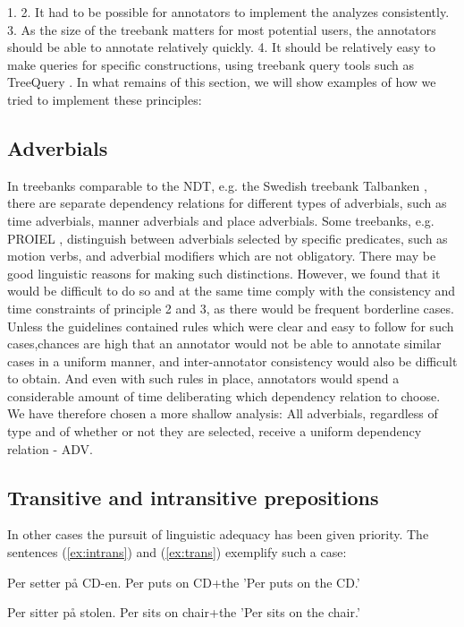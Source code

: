\documentclass[11pt,a4paper]{article}
\begin{document}
 1. 
2. It had to be possible for annotators to implement the analyzes consistently. 3. As the size of the treebank matters for most potential users, the annotators should be able to annotate relatively quickly.
4. It should be relatively easy to make queries for specific constructions, using treebank query tools such as TreeQuery \cite{Paj:Ste:09}. In what remains of this section, we will show examples of how we tried to implement these principles:

\subsection{Adverbials}
In treebanks comparable to the NDT, e.g. the Swedish treebank Talbanken \cite{Niv:Nil:Hal:2006}, there are separate dependency relations for different types of adverbials, such as time adverbials, manner adverbials and place adverbials. Some treebanks, e.g. PROIEL \cite{Hau:Joh:Eck:Wel:Her:Mut:2009}, distinguish between adverbials selected by specific predicates, such as motion verbs, and adverbial modifiers which are not obligatory. There may be good linguistic reasons for making such distinctions. However, we found that it would be difficult to do so and at the same time comply with the consistency and time constraints of principle 2 and 3, as there would be frequent borderline cases. Unless the guidelines contained rules which were clear and easy to follow for such cases,chances are high that an annotator would not be able to annotate similar cases in a uniform manner, and inter-annotator consistency would also be difficult to obtain. And even with such rules in place, annotators would spend a considerable amount of time deliberating which dependency relation to choose. We have therefore chosen a more shallow analysis: All adverbials, regardless of type and of whether or not they are selected, receive a uniform dependency relation - ADV.

\subsection{Transitive and intransitive prepositions}
In other cases the pursuit of linguistic adequacy has been given priority. The sentences (\ref{ex:intrans}) and (\ref{ex:trans}) exemplify such a case:

\begin{examples}
\item\label{ex:intrans}
\gll Per setter på CD-en.
Per puts on CD+the
\glt 'Per puts on the CD.'
\glend

\item\label{ex:trans}
\gll Per sitter på stolen.
Per sits on chair+the
\glt 'Per sits on the chair.'
\glend
\end{examples}
\end{document}
